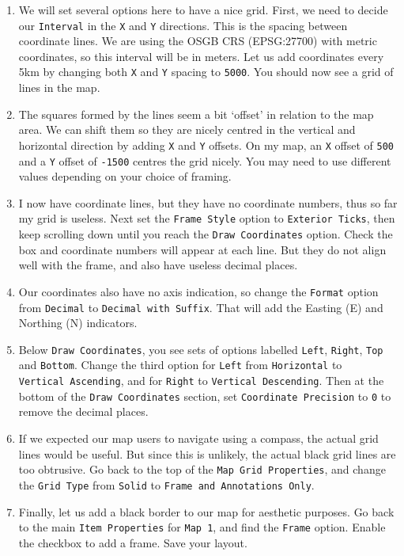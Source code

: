 \documentclass[
  letterpaper,
  DIV=11,
  numbers=noendperiod]{scrreprt}
\begin{document}
\begin{enumerate}
\def\labelenumi{(\arabic{enumi})}
\setcounter{enumi}{261}
\item
  We will set several options here to have a nice grid. First, we need
  to decide our \texttt{Interval} in the \texttt{X} and \texttt{Y}
  directions. This is the spacing between coordinate lines. We are using
  the OSGB CRS (EPSG:27700) with metric coordinates, so this interval
  will be in meters. Let us add coordinates every 5km by changing both
  \texttt{X} and \texttt{Y} spacing to \texttt{5000}. You should now see
  a grid of lines in the map.
\item
  The squares formed by the lines seem a bit `offset' in relation to the
  map area. We can shift them so they are nicely centred in the vertical
  and horizontal direction by adding \texttt{X} and \texttt{Y} offsets.
  On my map, an \texttt{X} offset of \texttt{500} and a \texttt{Y}
  offset of \texttt{-1500} centres the grid nicely. You may need to use
  different values depending on your choice of framing.
\item
  I now have coordinate lines, but they have no coordinate numbers, thus
  so far my grid is useless. Next set the \texttt{Frame\ Style} option
  to \texttt{Exterior\ Ticks}, then keep scrolling down until you reach
  the \texttt{Draw\ Coordinates} option. Check the box and coordinate
  numbers will appear at each line. But they do not align well with the
  frame, and also have useless decimal places.
\item
  Our coordinates also have no axis indication, so change the
  \texttt{Format} option from \texttt{Decimal} to
  \texttt{Decimal\ with\ Suffix}. That will add the Easting (E) and
  Northing (N) indicators.
\item
  Below \texttt{Draw\ Coordinates}, you see sets of options labelled
  \texttt{Left}, \texttt{Right}, \texttt{Top} and \texttt{Bottom}.
  Change the third option for \texttt{Left} from \texttt{Horizontal} to
  \texttt{Vertical\ Ascending}, and for \texttt{Right} to
  \texttt{Vertical\ Descending}. Then at the bottom of the
  \texttt{Draw\ Coordinates} section, set \texttt{Coordinate\ Precision}
  to \texttt{0} to remove the decimal places.
\item
  If we expected our map users to navigate using a compass, the actual
  grid lines would be useful. But since this is unlikely, the actual
  black grid lines are too obtrusive. Go back to the top of the
  \texttt{Map\ Grid\ Properties}, and change the \texttt{Grid\ Type}
  from \texttt{Solid} to \texttt{Frame\ and\ Annotations\ Only}.
\item
  Finally, let us add a black border to our map for aesthetic purposes.
  Go back to the main \texttt{Item\ Properties} for \texttt{Map\ 1}, and
  find the \texttt{Frame} option. Enable the checkbox to add a frame.
  Save your layout.
\end{enumerate}
\end{document}
